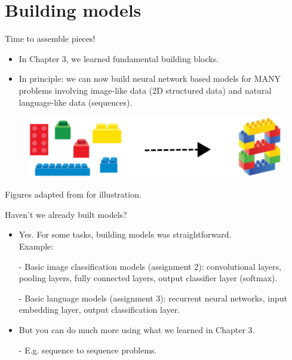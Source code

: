 \section{Building models}
\begin{frame}{Time to assemble pieces!}
\begin{itemize}
\item In Chapter 3, we learned fundamental building blocks.
\item In principle: we can now build neural network based models for MANY problems involving image-like data (2D structured data) and natural language-like data (sequences).
\end{itemize}
\vspace{7mm}
\begin{figure}
  \begin{center}
    \includegraphics[width=0.6\linewidth]{figures/lego.pdf}
  \end{center}
\end{figure}
\vspace{7mm}
\scriptsize{Figures adapted from \cite{le2020neurocoder} for illustration.}
\end{frame}

\begin{frame}{Haven't we already built models?}
\begin{itemize}
\item Yes. For some tasks, building models was straightforward.\\ Example:
\item[-] Basic image classification models (assignment 2): convolutional layers, pooling layers, fully connected layers, output classifier layer (softmax). 
\item[-] Basic language models (assignment 3): recurrent neural networks, input embedding layer, output classification layer.
\item But you can do much more using what we learned in Chapter 3.
\item[-] E.g. sequence to sequence problems.
\end{itemize}
\end{frame}

